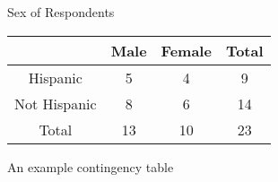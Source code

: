 \begin{figure}[h!]
  
  \centering
  \caption{An example contingency table}
  Sex of Respondents\\
  \begin{tabular}{cccc}
    \hline
                                     & Male & Female & Total \\ \hline
    Hispanic                         & 5    & 4      & 9     \\ \hline
    \multicolumn{1}{l}{Not Hispanic} & 8    & 6      & 14    \\ \hline
    Total                            & 13   & 10     & 23    \\ \hline
  \end{tabular}
  
\end{figure}